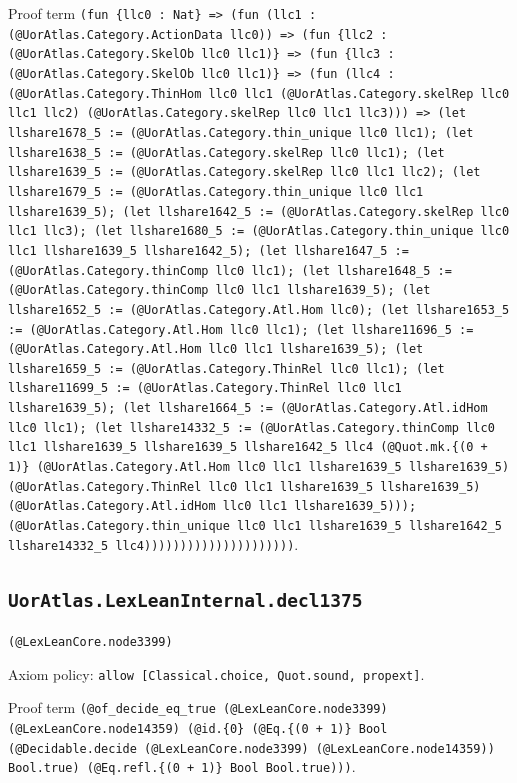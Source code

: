 \documentclass[11pt]{article}
\begin{document}
\noindent Proof term \texttt{(fun \{llc0 : Nat\} => (fun (llc1 : (@UorAtlas.Category.ActionData llc0)) => (fun \{llc2 : (@UorAtlas.Category.SkelOb llc0 llc1)\} => (fun \{llc3 : (@UorAtlas.Category.SkelOb llc0 llc1)\} => (fun (llc4 : (@UorAtlas.Category.ThinHom llc0 llc1 (@UorAtlas.Category.skelRep llc0 llc1 llc2) (@UorAtlas.Category.skelRep llc0 llc1 llc3))) => (let llshare1678\_5 := (@UorAtlas.Category.thin\_unique llc0 llc1); (let llshare1638\_5 := (@UorAtlas.Category.skelRep llc0 llc1); (let llshare1639\_5 := (@UorAtlas.Category.skelRep llc0 llc1 llc2); (let llshare1679\_5 := (@UorAtlas.Category.thin\_unique llc0 llc1 llshare1639\_5); (let llshare1642\_5 := (@UorAtlas.Category.skelRep llc0 llc1 llc3); (let llshare1680\_5 := (@UorAtlas.Category.thin\_unique llc0 llc1 llshare1639\_5 llshare1642\_5); (let llshare1647\_5 := (@UorAtlas.Category.thinComp llc0 llc1); (let llshare1648\_5 := (@UorAtlas.Category.thinComp llc0 llc1 llshare1639\_5); (let llshare1652\_5 := (@UorAtlas.Category.Atl.Hom llc0); (let llshare1653\_5 := (@UorAtlas.Category.Atl.Hom llc0 llc1); (let llshare11696\_5 := (@UorAtlas.Category.Atl.Hom llc0 llc1 llshare1639\_5); (let llshare1659\_5 := (@UorAtlas.Category.ThinRel llc0 llc1); (let llshare11699\_5 := (@UorAtlas.Category.ThinRel llc0 llc1 llshare1639\_5); (let llshare1664\_5 := (@UorAtlas.Category.Atl.idHom llc0 llc1); (let llshare14332\_5 := (@UorAtlas.Category.thinComp llc0 llc1 llshare1639\_5 llshare1639\_5 llshare1642\_5 llc4 (@Quot.mk.\{(0 + 1)\} (@UorAtlas.Category.Atl.Hom llc0 llc1 llshare1639\_5 llshare1639\_5) (@UorAtlas.Category.ThinRel llc0 llc1 llshare1639\_5 llshare1639\_5) (@UorAtlas.Category.Atl.idHom llc0 llc1 llshare1639\_5))); (@UorAtlas.Category.thin\_unique llc0 llc1 llshare1639\_5 llshare1642\_5 llshare14332\_5 llc4)))))))))))))))))))))}.\par
\subsection*{\texttt{UorAtlas.LexLeanInternal.decl1375}}
\noindent\texttt{(@LexLeanCore.node3399)}\par
\noindent Axiom policy: \texttt{allow [Classical.choice, Quot.sound, propext]}.\par
\noindent Proof term \texttt{(@of\_decide\_eq\_true (@LexLeanCore.node3399) (@LexLeanCore.node14359) (@id.\{0\} (@Eq.\{(0 + 1)\} Bool (@Decidable.decide (@LexLeanCore.node3399) (@LexLeanCore.node14359)) Bool.true) (@Eq.refl.\{(0 + 1)\} Bool Bool.true)))}.\par
\end{document}
